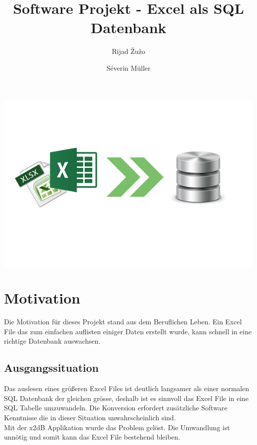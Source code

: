 \documentclass{article}
\begin{document}
\title{Software Projekt - Excel als SQL Datenbank }
\author{Rijad \v{Z}u\v{z}o \and Séverin Müller}

\maketitle

\vspace{60mm}
\begin{center}
		\includegraphics{SoftwareLogo}
\end{center}

\newpage
\tableofcontents
\newpage

\section{Motivation}
Die Motivation für dieses Projekt stand aus dem Beruflichen Leben. Ein Excel File das zum einfachen auflisten einiger Daten erstellt wurde, kann schnell in eine richtige Datenbank auswachsen.

\subsection{Ausgangssituation}
Das auslesen eines größeren Excel Files ist deutlich langsamer als einer normalen SQL Datenbank der gleichen grösse, deshalb ist es sinnvoll das Excel File in eine SQL Tabelle umzuwandeln. \newline 
Die Konversion erfordert zusätzliche Software Kenntnisse die in dieser Situation unwahrscheinlich sind. \\

Mit der x2dB Applikation wurde das Problem gelöst. Die Umwandlung ist unnötig und somit kann das Excel File bestehend bleiben.
\end{document}
